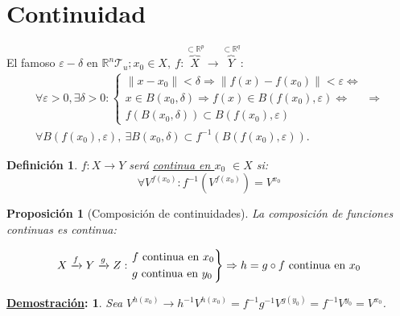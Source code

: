 \documentclass[10pt,a4paper,openright]{book}
\theoremstyle{break}
\newtheorem*{defi}{Definición}
\newtheorem*{prop}{Proposición}
\newtheorem*{demo}{\underline{Demostración}:}
\begin{document}
\section{Continuidad}%
\label{sec:continuidad}
El famoso $\varepsilon-\delta$ en $\mathbb{R}^n \mathcal{T}_u; x_0 \in X,\ f : \overbrace{X}^{\subset \mathbb{R}^p} \rightarrow \overbrace{Y}^{\subset \mathbb{R}^q}$: 
\begin{gather*}        
\forall \varepsilon > 0, \exists \delta > 0: 
\begin{cases}
    \lVert x - x_0 \rVert < \delta \Rightarrow \lVert f\left( x \right) - f\left( x_0 \right) \rVert < \varepsilon \Leftrightarrow\\
    x \in B\left( x_0, \delta \right) \Rightarrow f\left( x \right) \in B\left( f\left( x_0 \right), \varepsilon \right) \Leftrightarrow\\
    f\left( B\left( x_0, \delta \right) \right) \subset B\left( f\left( x_0 \right), \varepsilon \right) 
\end{cases} \Rightarrow\\
\boxed{\forall B\left( f\left( x_0 \right), \varepsilon \right),\ \exists B\left( x_0, \delta \right) \subset f^{-1}\left( B\left( f\left( x_0 \right), \varepsilon \right) \right)} 
.\end{gather*}

\begin{defi}
$f: X \rightarrow Y$ será \underline{continua en $x_0$} $\in X$ si: 
\[
\forall V^{f\left( x_0 \right)}: f^{-1}\left( V^{f\left( x_0 \right)} \right) = V^{x_0} 
\]
\end{defi}

\begin{prop}[Composición de continuidades]
La composición de funciones continuas es continua:

\[
X \xrightarrow{f} Y \xrightarrow{g} Z: \begin{rcases}
    f \text{ continua en } x_0\\
    g \text{ continua en } y_0
\end{rcases} \Rightarrow h = g \circ f \text{ continua en }  x_0
\]
\end{prop}
\begin{demo}
Sea $V^{h\left( x_0 \right)} \rightarrow h^{-1} V^{h\left( x_0 \right)} = f^{-1}g^{-1}V^{g\left( y_0 \right)} = f^{-1} V^{y_0} = V^{x_0}$.
\end{demo}
\end{document}
